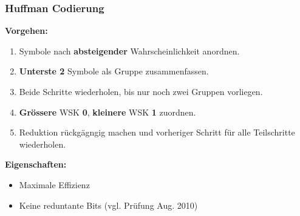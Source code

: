 \subsubsection{Huffman Codierung }
\begin{multicols}{2}
  
  \columnbreak
  
  	\textbf{Vorgehen:}
  	\begin{enumerate}
	  \item Symbole nach \textbf{absteigender} Wahrscheinlichkeit anordnen.
	  \item \textbf{Unterste 2} Symbole als Gruppe zusammenfassen.
	  \item Beide Schritte wiederholen, bis nur noch zwei Gruppen vorliegen.
	  \item \textbf{Grössere} WSK \textbf{0}, \textbf{kleinere} WSK \textbf{1} zuordnen.
	  \item Reduktion rückgägngig machen und vorheriger Schritt für alle Teilschritte wiederholen.
	\end{enumerate}	
	
	\textbf{Eigenschaften:}
	\begin{itemize}
	  \item Maximale Effizienz
	  \item Keine reduntante Bits (vgl. Prüfung Aug. 2010)
	\end{itemize}
\end{multicols}
